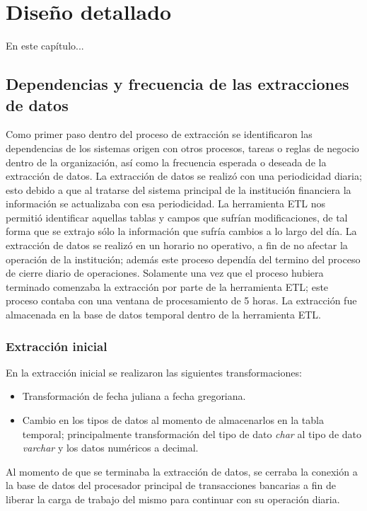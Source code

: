 \chapter{Diseño detallado}
\label{cap:diseno-detallado}

En este capítulo...

\section{Dependencias y frecuencia de las extracciones de datos}

Como primer paso dentro del proceso de extracción se identificaron las
dependencias de los sistemas origen con otros procesos, tareas o reglas de
negocio dentro de la organización, así como la frecuencia esperada o deseada de
la extracción de datos. La extracción de datos se realizó con una periodicidad
diaria; esto debido a que al tratarse del sistema principal de la institución
financiera la información se actualizaba con esa periodicidad. La herramienta
ETL nos permitió identificar aquellas tablas y campos que sufrían
modificaciones, de tal forma que se extrajo sólo la información que sufría
cambios a lo largo del día. La extracción de datos se realizó en un horario no
operativo, a fin de no afectar la operación de la institución; además este
proceso dependía del termino del proceso de cierre diario de
operaciones. Solamente una vez que el proceso hubiera terminado comenzaba la
extracción por parte de la herramienta ETL; este proceso contaba con una ventana
de procesamiento de 5 horas. La extracción fue almacenada en la base de datos
temporal dentro de la herramienta ETL.

\subsection{Extracción inicial}

En la extracción inicial se realizaron las siguientes transformaciones:

\begin{itemize}
\item Transformación de fecha juliana a fecha gregoriana.
\item Cambio en los tipos de datos al momento de almacenarlos en la tabla
  temporal; principalmente transformación del tipo de dato \textit{char} al tipo
  de dato \textit{varchar} y los datos numéricos a decimal.
\end{itemize}

Al momento de que se terminaba la extracción de datos, se cerraba la conexión a
la base de datos del procesador principal de transacciones bancarias a fin de
liberar la carga de trabajo del mismo para continuar con su operación diaria.

